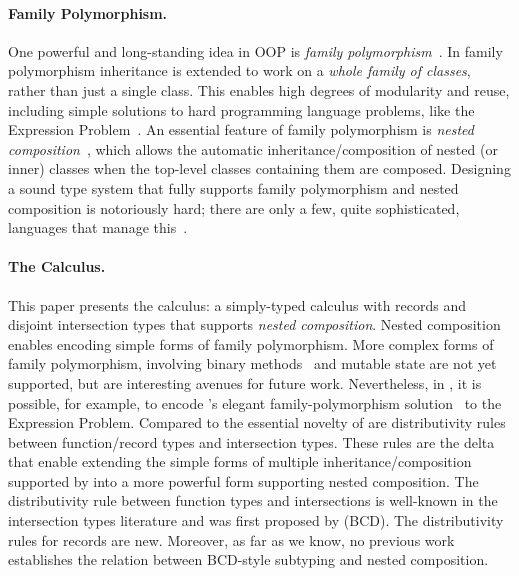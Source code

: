 \paragraph{Family Polymorphism.}
One powerful and long-standing idea in OOP is \emph{family
  polymorphism}~\citep{Ernst_2001}. In family polymorphism inheritance is
extended to work on a \emph{whole family of classes}, rather than just a single
class. This enables high degrees of modularity and
reuse, including simple solutions to hard programming language problems, like
the Expression Problem~\citep{wadler1998expression}. An essential feature of
family polymorphism is \emph{nested composition}~\citep{Corradi_2012,
  ErnstVirtual, Nystrom_2004}, which allows the automatic
inheritance/composition of nested (or inner) classes when the top-level classes
containing them are composed. Designing a sound type system that fully supports family
polymorphism and nested composition is notoriously hard; there are only
a few, quite sophisticated, languages that manage this~\citep{ErnstVirtual, Nystrom_2004, pubsdoc:tribe-virtual-calculus, SAITO_2007}. 

\paragraph{The \name Calculus.}
This paper presents the \name calculus: a simply-typed calculus with records and
disjoint intersection types that supports \emph{nested composition}. Nested composition enables
encoding simple forms of family polymorphism. More complex forms of
family polymorphism, involving binary methods~\citep{bruce1995binary} and mutable state are
not yet supported, but are interesting avenues for future work.
Nevertheless, in \name, it is
possible, for example, to encode \citeauthor{Ernst_2001}'s elegant family-polymorphism solution~\citep{Ernst_2001} to
the Expression Problem. 
Compared to \oname the essential novelty of \name are
distributivity rules between function/record types and intersection
types. These rules are the delta that enable extending the simple
forms of multiple inheritance/composition supported by \oname into a
more powerful form supporting nested composition. The distributivity
rule between function types and intersections is
well-known in the intersection types literature and was first proposed by
\citet{Barendregt_1983} (BCD). The distributivity rules for records are
new. Moreover, as far as we know, no previous work
establishes the relation between BCD-style subtyping and nested composition.

